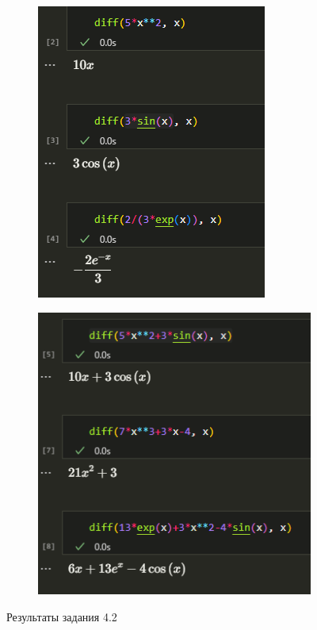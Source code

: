 \documentclass[14pt,a4paper]{extarticle}
\begin{document}
\begin{figure}[ht!]
    \centering
    \begin{subfigure}{.5\textwidth}
        \centering
        \includegraphics[width=0.7\linewidth]{figures/2-1.png}
    \end{subfigure}%
    \begin{subfigure}{.5\textwidth}
        \centering
        \includegraphics[width=0.7\linewidth]{figures/2-2.png}
    \end{subfigure}%
    \caption{Результаты задания 4.2}
    \label{fig:4.2}
\end{figure}
\end{document}
